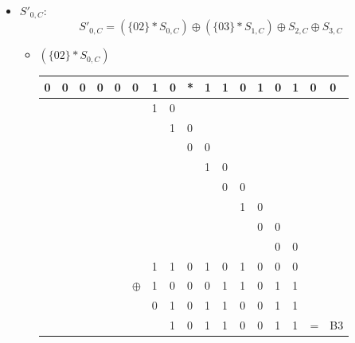\begin{itemize}
     \item $S'_{0,C}$:
     \begin{equation}
         S'_{0,C} = (\{02\} * S_{0,C}) \oplus (\{03\} * S_{1,C}) \oplus S_{2,C} \oplus S_{3,C}
     \end{equation}

     \begin{itemize}
         \item $(\{02\} * S_{0,C})$

\begin{center}
\begin{tabular}{lllllllllllllllll}
0 & 0 & 0 & 0 & 0 & 0 & 1 & 0 & * & 1 & 1 & 0 & 1 & 0 & 1 & 0 & 0\\
\hline
 &  &  &  &  &  & 1 & 0 &  &  &  &  &  &  &  &  & \\
 &  &  &  &  &  &  & 1 & 0 &  &  &  &  &  &  &  & \\
 &  &  &  &  &  &  &  & 0 & 0 &  &  &  &  &  &  & \\
 &  &  &  &  &  &  &  &  & 1 & 0 &  &  &  &  &  & \\
 &  &  &  &  &  &  &  &  &  & 0 & 0 &  &  &  &  & \\
 &  &  &  &  &  &  &  &  &  &  & 1 & 0 &  &  &  & \\
 &  &  &  &  &  &  &  &  &  &  &  & 0 & 0 &  &  & \\
 &  &  &  &  &  &  &  &  &  &  &  &  & 0 & 0 &  & \\
 \hline
 &  &  &  &  &  & 1 & 1 & 0 & 1 & 0 & 1 & 0 & 0 & 0 &  & \\
 &  &  &  &  & $\oplus$ & 1 & 0 & 0 & 0 & 1 & 1 & 0 & 1 & 1 &  & \\
 \hline
 &  &  &  &  &  & 0 & 1 & 0 & 1 & 1 & 0 & 0 & 1 & 1 &  & \\
 &  &  &  &  &  &  & 1 & 0 & 1 & 1 & 0 & 0 & 1 & 1 & = & B3
         \end{tabular}
         \end{center}


\end{itemize}
\end{itemize}
